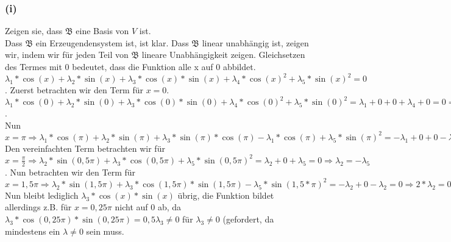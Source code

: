 \documentclass[12pt]{article}
\begin{document}
\subsubsection*{(i)}Zeigen sie, dass $\mathfrak{B}$ eine Basis von $V$ ist.\\
Dass $\mathfrak{B}$ ein Erzeugendensystem ist, ist klar. Dass $\mathfrak{B}$ linear unabh{\"a}ngig ist, zeigen wir, indem wir f{\"u}r jeden Teil von $\mathfrak{B}$ lineare Unabh{\"a}ngigkeit zeigen. Gleichsetzen des Termes mit 0 bedeutet, dass die Funktion alle x auf 0 abbildet.
$\lambda_1*\cos(x)+\lambda_2*\sin(x)+\lambda_3*\cos(x)*\sin(x)+\lambda_4*\cos(x)^2+\lambda_5*\sin(x)^2 = 0$. Zuerst betrachten wir den Term f{\"u}r $x=0$.\\
$\lambda_1*\cos(0)+\lambda_2*\sin(0)+\lambda_3*\cos(0)*\sin(0)+\lambda_4*\cos(0)^2+\lambda_5*\sin(0)^2=\lambda_1+0+0+\lambda_4+0=0 \Rightarrow \lambda_1=-\lambda_4$.\\ Nun $x=\pi \Rightarrow \lambda_1*\cos(\pi)+\lambda_2*\sin(\pi)+\lambda_3*\sin(\pi)*\cos(\pi)-\lambda_1*\cos(\pi)+\lambda_5*\sin(\pi)^2=-\lambda_1+0+0-\lambda_1+0=0 \Rightarrow -2\lambda_1=0\Rightarrow \lambda_1=\lambda_4=0$\\ Den vereinfachten Term betrachten wir f{\"u}r $x=\frac{\pi}{2} \Rightarrow \lambda_2*\sin(0,5\pi)+\lambda_3*\cos(0,5\pi)+\lambda_5*\sin(0,5\pi)^2=\lambda_2+0+\lambda_5=0 \Rightarrow \lambda_2=-\lambda_5$. Nun betrachten wir den Term f{\"u}r $x=1,5\pi \Rightarrow \lambda_2*\sin(1,5\pi)+\lambda_3*\cos(1,5\pi)*\sin(1,5\pi)-\lambda_5*\sin(1,5*\pi)^2=-\lambda_2+0-\lambda_2=0 \Rightarrow 2*\lambda_2=0 \Rightarrow \lambda_2 = 0$ Nun bleibt lediglich $\lambda_3*\cos(x)*\sin(x)$ {\"u}brig, die Funktion bildet allerdings z.B. f{\"u}r $x=0,25\pi$ nicht auf $0$ ab, da $\lambda_3*\cos(0,25\pi)*\sin(0,25\pi)=0,5\lambda_3 \neq 0$ f{\"u}r $\lambda_3 \neq 0$ (gefordert, da mindestens ein $\lambda \neq 0$ sein muss.
\end{document}
